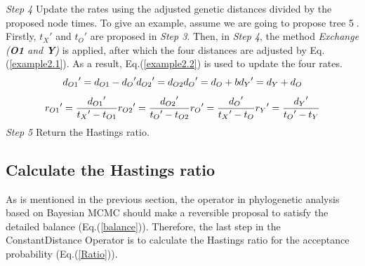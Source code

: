 \documentclass{bmcart}
\begin{document}
\emph{Step 4}  Update the rates using the adjusted genetic distances divided by the proposed node times. To give an example, assume we are going to propose tree \textcircled5. Firstly, ${t_X}'$ and ${t_O}'$ are proposed in \emph{Step 3}.  Then, in \emph{Step 4}, the method \textit{Exchange (\textbf{O1} and \textbf{Y})} is applied, after which the four distances are adjusted by Eq.(\ref{example2.1}). As a result, Eq.(\ref{example2.2}) is used to update the four rates.
\begin{equation}\label{example2.1}
{d_{O1}}' = {d_{O1}} - {d_O}'  \\
{d_{O2}}' = {d_{O2}}  \\
{d_O}' = {d_O} + b  \\
{d_Y}' = {d_Y} + {d_O} 
\end{equation}
\begin{equation}\label{example2.2}
{r_{O1}}' = \frac{{{d_{O1}}'}}{{{t_X}' - {t_{O1}}}} \\
{r_{O2}}' = \frac{{{d_{O2}}'}}{{{t_O}' - {t_{O2}}}} \\
{r_O}' = \frac{{{d_O}'}}{{{t_X}' - {t_O}}} \\
{r_Y}' = \frac{{{d_Y}'}}{{{t_O}' - {t_Y}}} 
\end{equation}
\emph{Step 5} Return the Hastings ratio.

\subsection*{Calculate the Hastings ratio}
As is mentioned in the previous section, the operator in phylogenetic analysis based on Bayesian MCMC should make a reversible proposal to satisfy the detailed balance (Eq.(\ref{balance})). Therefore, the last step in the ConstantDistance Operator is to calculate the Hastings ratio for the acceptance probability (Eq.(\ref{Ratio})). 
\end{document}

